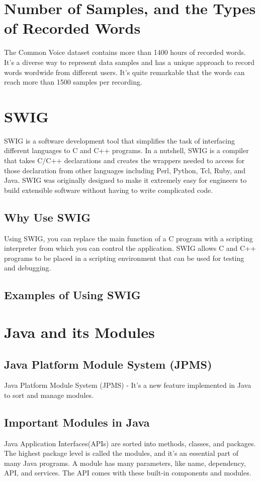 \documentclass[english,12pt,oneside,a4paper]{article}
\begin{document}
\begin{center}
		\section{Number of Samples, and the Types of Recorded Words}
		The Common Voice dataset contains more than 1400 hours of recorded words. It's a diverse way to represent data samples and has a unique approach to record words wordwide from different users. It's quite remarkable that the words can reach more than 1500 samples per recording. 
		\section{SWIG}
		SWIG is a software development tool that simplifies the task of interfacing different languages to C and C++ programs. In a nutshell, SWIG is a compiler that takes C/C++ declarations and creates the wrappers needed to access for those declaration from other languages including Perl, Python, Tcl, Ruby, and Java. SWIG was originally designed to make it extremely easy for engineers to build extensible software without having to write complicated code.
		\subsection{Why Use SWIG}
		Using SWIG, you can replace the main function of a C program with a scripting interpreter from which you can control the application. SWIG allows C and C++ programs to be placed in a scripting environment that can be used for testing and debugging.
		\subsection{Examples of Using SWIG}
		
		\section{Java and its Modules}
		\subsection{Java Platform Module System (JPMS)}
		Java Platform Module System (JPMS) - It's a new feature implemented in Java to sort and manage modules.
		\subsection{Important Modules in Java}
		Java Application Interfaces(APIs) are sorted into methods, classes, and packages. The highest package level is called the modules, and it's an essential part of many Java programs. A module has many parameters, like name, dependency, API, and services. The API comes with these built-in components and modules. 		

\end{center}
\end{document}
